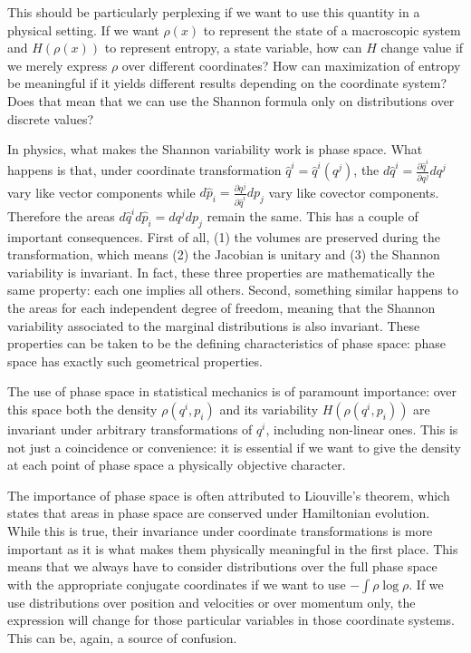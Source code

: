 \documentclass[iopart]{revtex4-1}
\begin{document}
This should be particularly perplexing if we want to use this quantity in a physical setting. If we want $\rho(x)$ to represent the state of a macroscopic system and $H(\rho(x))$ to represent entropy, a state variable, how can $H$ change value if we merely express $\rho$ over different coordinates? How can maximization of entropy be meaningful if it yields different results depending on the coordinate system? Does that mean that we can use the Shannon formula only on distributions over discrete values?

In physics, what makes the Shannon variability work is phase space. What happens is that, under coordinate transformation $\hat{q}^i = \hat{q}^i(q^j)$, the $d\hat{q}^i = \frac{\partial \hat{q}^i}{\partial q^j } dq^j$ vary like vector components while $d\hat{p}_i = \frac{\partial q^j}{\partial \hat{q}^i } dp_j$ vary like covector components. Therefore the areas $d\hat{q}^i d\hat{p}_i = dq^j dp_j$ remain the same. This has a couple of important consequences. First of all, (1) the volumes are preserved during the transformation, which means (2) the Jacobian is unitary and (3) the Shannon variability is invariant. In fact, these three properties are mathematically the same property: each one implies all others. Second, something similar happens to the areas for each independent degree of freedom, meaning that the Shannon variability associated to the marginal distributions is also invariant. These properties can be taken to be the defining characteristics of phase space: phase space has exactly such geometrical properties.\cite{AoP2020HamiltonianEntropy}

The use of phase space in statistical mechanics is of paramount importance: over this space both the density $\rho(q^i, p
_i)$ and its variability $H(\rho(q^i, p
_i))$ are invariant under arbitrary transformations of $q^i$, including non-linear ones. This is not just a coincidence or convenience: it is essential if we want to give the density at each point of phase space a physically objective character.

The importance of phase space is often attributed to Liouville's theorem, which states that areas in phase space are conserved under Hamiltonian evolution. While this is true, their invariance under coordinate transformations is more important as it is what makes them physically meaningful in the first place. This means that we always have to consider distributions over the full phase space with the appropriate conjugate coordinates if we want to use $-\int \rho \log \rho$. If we use distributions over position and velocities or over momentum only, the expression will change for those particular variables in those coordinate systems. This can be, again, a source of confusion.\cite{Dunkel}
\end{document}

